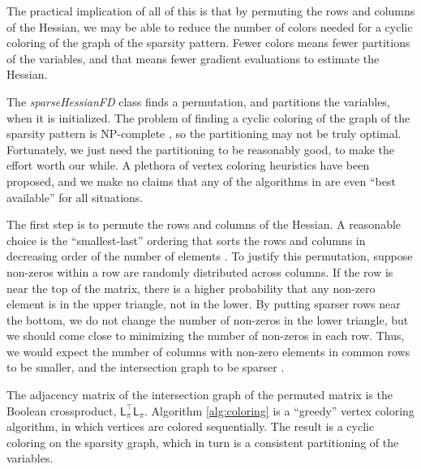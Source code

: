 \documentclass[jss]{jss}\usepackage[]{graphicx}\usepackage[]{color}
\newcommand{\class}[1]{\textsl{#1}}
\newcommand{\hessLT}[2]{\mathsf{L}_{#1}#2}
\begin{document}
The practical implication of all of this is that by permuting the
rows and columns of the Hessian, we may be able to reduce the
number of colors needed for a cyclic coloring of the graph of the
sparsity pattern.  Fewer colors means fewer partitions of the
variables, and that means fewer gradient evaluations to
estimate the Hessian.

The \class{sparseHessianFD}
class finds a permutation, and partitions the variables, when it is
initialized. The problem of finding a cyclic
coloring of the graph of the sparsity pattern is NP-complete
\citep{ColemanCai1986}, so the partitioning may not be truly optimal.
Fortunately, we just need the partitioning to be reasonably good, to
make the effort worth our
while.  A plethora of vertex coloring heuristics have been proposed,
and we make no claims that any of the algorithms in  are even
``best available'' for all situations.

The first step is to permute the rows and columns of the Hessian.   A
reasonable choice is the ``smallest-last'' ordering that
sorts the rows and columns in decreasing order of the number of
elements \citep[Theorem 6.2]{ColemanMore1984}. To justify this permutation, suppose
non-zeros within a row are randomly distributed across
columns.  If the row is near the top of the matrix, there is a higher
probability that any non-zero element is in the upper triangle, not in
the lower.  By putting sparser rows near the bottom, we do not change
the number of non-zeros in the lower triangle, but we should come
close to minimizing the number of non-zeros in each row.  Thus, we
would expect the number of columns with non-zero elements in common
rows to be smaller, and the intersection graph to be sparser \citep{GebremedhinTarafdar2007}.

The adjacency matrix of the intersection graph of the permuted matrix
is the Boolean crossproduct, $\hessLT{\pi}{}^\top \hessLT{\pi}{}$.
Algorithm \ref{alg:coloring} is a ``greedy'' vertex coloring
algorithm, in which vertices are colored sequentially.  The result is
a cyclic coloring on the sparsity graph, which in turn is a consistent
partitioning of the variables.
\end{document}
